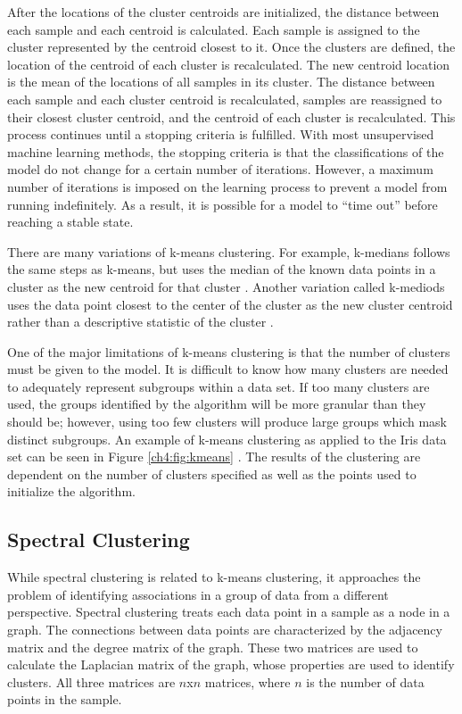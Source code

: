 After the locations of the cluster centroids are initialized, the distance between each sample and each centroid is calculated. Each sample is assigned to the cluster represented by the centroid closest to it. Once the clusters are defined, the location of the centroid of each cluster is recalculated. The new centroid location is the mean of the locations of all samples in its cluster. The distance between each sample and each cluster centroid is recalculated, samples are reassigned to their closest cluster centroid, and the centroid of each cluster is recalculated. This process continues until a stopping criteria is fulfilled. With most unsupervised machine learning methods, the stopping criteria is that the classifications of the model do not change for a certain number of iterations. However, a maximum number of iterations is imposed on the learning process to prevent a model from running indefinitely. As a result, it is possible for a model to ``time out'' before reaching a stable state.

There are many variations of k-means clustering. For example, k-medians follows the same steps as k-means, but uses the median of the known data points in a cluster as the new centroid for that cluster \cite{Juan1998}. Another variation called k-mediods uses the data point closest to the center of the cluster as the new cluster centroid rather than a descriptive statistic of the cluster \cite{Kaufman1987}.

One of the major limitations of k-means clustering is that the number of clusters must be given to the model. It is difficult to know how many clusters are needed to adequately represent subgroups within a data set. If too many clusters are used, the groups identified by the algorithm will be more granular than they should be; however, using too few clusters will produce large groups which mask distinct subgroups. An example of k-means clustering as applied to the Iris data set can be seen in Figure \ref{ch4:fig:kmeans} \cite{Varoquaux2019}. The results of the clustering are dependent on the number of clusters specified as well as the points used to initialize the algorithm.


\subsection{Spectral Clustering}

While spectral clustering is related to k-means clustering, it approaches the problem of identifying associations in a group of data from a different perspective. Spectral clustering treats each data point in a sample as a node in a graph. The connections between data points are characterized by the adjacency matrix and the degree matrix of the graph. These two matrices are used to calculate the Laplacian matrix of the graph, whose properties are used to identify clusters. All three matrices are $n$x$n$ matrices, where $n$ is the number of data points in the sample. 

